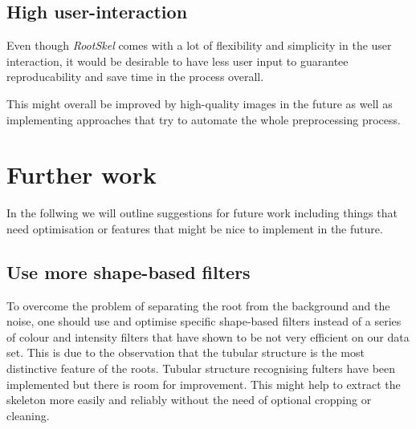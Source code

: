 \subsection{High user-interaction}

Even though \textit{RootSkel} comes with a lot of flexibility and simplicity in the user interaction, it would be desirable to have less user input to guarantee reproducability and save time in the process overall. 

This might overall be improved by high-quality images in the future as well as implementing approaches that try to automate the whole preprocessing process.








 
\section{Further work}

In the follwing we will outline suggestions for future work including things that need optimisation or features that might be nice to implement in the future. 


\subsection{Use more shape-based filters}

To overcome the problem of separating the root from the background and the noise, one should use and optimise specific shape-based filters instead of a series of colour and intensity filters that have shown to be not very efficient on our data set. This is due to the observation that the tubular structure is the most distinctive feature of the roots. Tubular structure recognising fulters have been implemented but there is room for improvement. This might help to extract the skeleton more easily and reliably without the need of optional cropping or cleaning.


